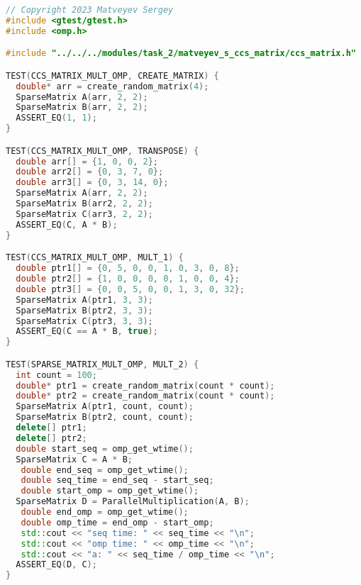 \documentclass{report}
\begin{document}
\begin{lstlisting}[language=C++]
// Copyright 2023 Matveyev Sergey
#include <gtest/gtest.h>
#include <omp.h>

#include "../../../modules/task_2/matveyev_s_ccs_matrix/ccs_matrix.h"

TEST(CCS_MATRIX_MULT_OMP, CREATE_MATRIX) {
  double* arr = create_random_matrix(4);
  SparseMatrix A(arr, 2, 2);
  SparseMatrix B(arr, 2, 2);
  ASSERT_EQ(1, 1);
}

TEST(CCS_MATRIX_MULT_OMP, TRANSPOSE) {
  double arr[] = {1, 0, 0, 2};
  double arr2[] = {0, 3, 7, 0};
  double arr3[] = {0, 3, 14, 0};
  SparseMatrix A(arr, 2, 2);
  SparseMatrix B(arr2, 2, 2);
  SparseMatrix C(arr3, 2, 2);
  ASSERT_EQ(C, A * B);
}

TEST(CCS_MATRIX_MULT_OMP, MULT_1) {
  double ptr1[] = {0, 5, 0, 0, 1, 0, 3, 0, 8};
  double ptr2[] = {1, 0, 0, 0, 0, 1, 0, 0, 4};
  double ptr3[] = {0, 0, 5, 0, 0, 1, 3, 0, 32};
  SparseMatrix A(ptr1, 3, 3);
  SparseMatrix B(ptr2, 3, 3);
  SparseMatrix C(ptr3, 3, 3);
  ASSERT_EQ(C == A * B, true);
}

TEST(SPARSE_MATRIX_MULT_OMP, MULT_2) {
  int count = 100;
  double* ptr1 = create_random_matrix(count * count);
  double* ptr2 = create_random_matrix(count * count);
  SparseMatrix A(ptr1, count, count);
  SparseMatrix B(ptr2, count, count);
  delete[] ptr1;
  delete[] ptr2;
  double start_seq = omp_get_wtime();
  SparseMatrix C = A * B;
   double end_seq = omp_get_wtime();
   double seq_time = end_seq - start_seq;
   double start_omp = omp_get_wtime();
  SparseMatrix D = ParallelMultiplication(A, B);
   double end_omp = omp_get_wtime();
   double omp_time = end_omp - start_omp;
   std::cout << "seq time: " << seq_time << "\n";
   std::cout << "omp time: " << omp_time << "\n";
   std::cout << "a: " << seq_time / omp_time << "\n";
  ASSERT_EQ(D, C);
}


\end{lstlisting}
\end{document}
